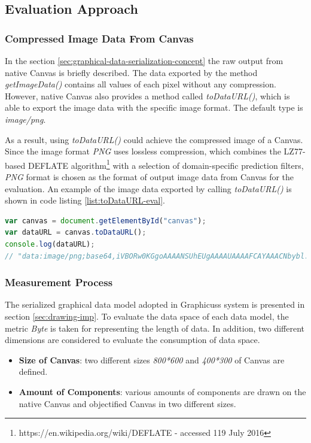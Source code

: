 
\subsection{Evaluation Approach}

\subsubsection{Compressed Image Data From Canvas}
In the section \ref{sec:graphical-data-serialization-concept} the raw output from native Canvas is briefly described. The data exported by the method \textit{getImageData()} contains all values of each pixel without any compression. However, native Canvas also provides a method called \textit{toDataURL()}, which is able to export the image data with the specific image format. The default type is \textit{image/png}.

As a result, using \textit{toDataURL()} could achieve the compressed image  of a Canvas. Since the image format \textit{PNG} uses lossless compression, which combines the LZ77-based DEFLATE algorithm\footnote{https://en.wikipedia.org/wiki/DEFLATE - accessed 119 July 2016} with a selection of domain-specific prediction filters, \textit{PNG} format is chosen as the format of output image data  from Canvas for the evaluation\cite{barron1998minimum}. An example of the image data exported by calling \textit{toDataURL()} is shown in code listing \ref{list:toDataURL-eval}.


\begin{lstlisting}[language=JavaScript, caption=Example of image data exported fro native Canvas while calling toDataURL() , label={list:toDataURL-eval}]
var canvas = document.getElementById("canvas");
var dataURL = canvas.toDataURL();
console.log(dataURL);
// "data:image/png;base64,iVBORw0KGgoAAAANSUhEUgAAAAUAAAAFCAYAAACNbybl...ADElEQVQImWNgoBMAAABpAAFEI8ARAAAAAElFTkSuQmCC"
\end{lstlisting}

\subsubsection{Measurement Process}
The serialized graphical data model adopted in Graphicuss system is presented in section \ref{sec:drawing-imp}. To evaluate the data space of each data model, the metric \textit{Byte} is taken for representing the length of data. In addition, two different dimensions are considered to evaluate the consumption of data space.

\begin{itemize}
  \item \textbf{Size of Canvas}: two different sizes \textit{800*600} and \textit{400*300} of Canvas are defined.
  \item \textbf{Amount of Components}: various amounts of components are drawn on the native Canvas and objectified Canvas in two different sizes.
\end{itemize}

